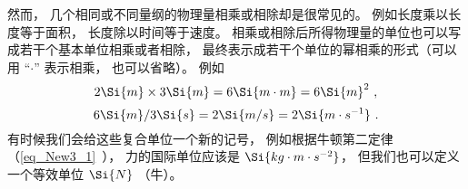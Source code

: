 然而， 几个相同或不同量纲的物理量相乘或相除却是很常见的。 例如长度乘以长度等于面积， 长度除以时间等于速度。 相乘或相除后所得物理量的单位也可以写成若干个基本单位相乘或者相除， 最终表示成若干个单位的幂相乘的形式（可以用 “$\cdot$” 表示相乘， 也可以省略）。 例如
\begin{equation}
2\Si{m} \times 3\Si{m} = 6\Si{m\cdot m} = 6\Si{m}^2~,
\end{equation}
\begin{equation}
6\Si{m} / 3\Si{s} = 2 \Si{m/s} = 2 \Si{m \cdot s^{-1}}~.
\end{equation}
有时候我们会给这些复合单位一个新的记号， 例如根据牛顿第二定律（\autoref{eq_New3_1}~）， 力的国际单位应该是 $\Si{kg\cdot m\cdot s^{-2}}$， 但我们也可以定义一个等效单位 $\Si{N}$ （牛）。



